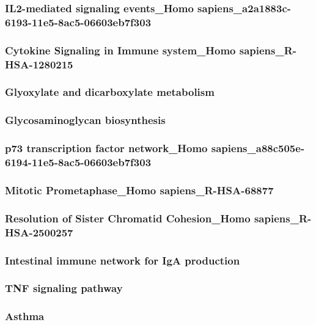 \documentclass[3p,authoryear,preprint,12pt]{elsarticle}
\begin{document}
\subsubsection{IL2-mediated signaling events\_Homo sapiens\_a2a1883c-6193-11e5-8ac5-06603eb7f303}

\subsubsection{Cytokine Signaling in Immune system\_Homo sapiens\_R-HSA-1280215}

\subsubsection{Glyoxylate and dicarboxylate metabolism}

\subsubsection{Glycosaminoglycan biosynthesis}

\subsubsection{p73 transcription factor network\_Homo sapiens\_a88c505e-6194-11e5-8ac5-06603eb7f303}

\subsubsection{Mitotic Prometaphase\_Homo sapiens\_R-HSA-68877}

\subsubsection{Resolution of Sister Chromatid Cohesion\_Homo sapiens\_R-HSA-2500257}

\subsubsection{Intestinal immune network for IgA production}

\subsubsection{TNF signaling pathway}

\subsubsection{Asthma}
\end{document}
